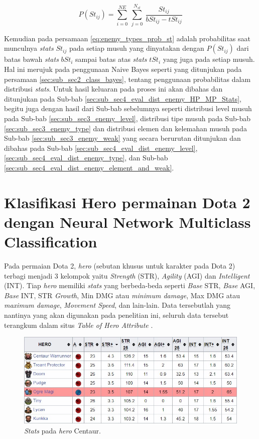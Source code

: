 \begin{equation}\label{eq:enemy_types_prob_st}
P(St_{ij}) = \sum_{i=0}^{NE}\ \sum_{j=0}^{N_{st}}\ \frac{St_{ij}}{bSt_{ij} - tSt_{ij}}
\end{equation}

Kemudian pada persamaan \ref{eq:enemy_types_prob_st} adalah probabilitas saat munculnya \textit{stats} $St_{ij}$ pada setiap musuh yang dinyatakan dengan $P(St_{ij})$ dari batas bawah \textit{stats} $bSt_{i}$ sampai batas atas \textit{stats} $tSt_{i}$ yang juga pada setiap musuh. Hal ini merujuk pada penggunaan Naive Bayes seperti yang ditunjukan pada persamaan \ref{sec:sub_sec2_class_bayes}, tentang penggunaan probabilitas dalam distribusi \textit{stats}. Untuk hasil keluaran pada proses ini akan dibahas dan ditunjukan pada Sub-bab \ref{sec:sub_sec4_eval_dist_enemy_HP_MP_Stats}, begitu juga dengan hasil dari Sub-bab sebelumnya seperti distribusi level musuh pada Sub-bab \ref{sec:sub_sec3_enemy_level}, distribusi tipe musuh pada Sub-bab \ref{sec:sub_sec3_enemy_type} dan distribusi elemen dan kelemahan musuh pada Sub-bab \ref{sec:sub_sec3_enemy_weak} yang secara berurutan ditunjukan dan dibahas pada Sub-bab \ref{sec:sub_sec4_eval_dist_enemy_level}, \ref{sec:sub_sec4_eval_dist_enemy_type}, dan Sub-bab \ref{sec:sub_sec4_eval_dist_enemy_element_and_weak}. 
\vspace{1ex}

\section{Klasifikasi Hero permainan Dota 2 dengan Neural Network Multiclass Classification}
\label{sec:sec3_dota2_method}
\vspace{1ex}

Pada permaian Dota 2, \textit{hero} (sebutan khusus untuk karakter pada Dota 2) terbagi menjadi 3 kelompok yaitu \textit{Strength} (STR), \textit{Agility} (AGI) dan \textit{Intelligent} (INT). Tiap \textit{hero} memiliki \textit{stats} yang berbeda-beda seperti \textit{Base} STR, \textit{Base} AGI, \textit{Base} INT, STR \textit{Growth}, Min DMG atau \textit{minimum damage}, Max DMG atau \textit{maximum damage}, \textit{Movement Speed}, dan lain-lain. Data tersebutlah yang nantinya yang akan digunakan pada penelitian ini, seluruh data tersebut terangkum dalam situs \textit{Table of Hero Attribute} \citep{dota2020}.
\vspace{1ex}

\begin{figure} [!h] \centering
	\includegraphics[scale=0.53]{img/centa.jpg}
	\caption{\textit{Stats} pada \textit{hero} Centaur.}
	\label{fig:centa}
\end{figure}

